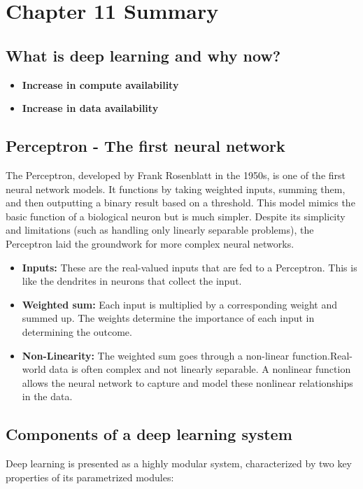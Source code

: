 \documentclass{article}
\begin{document}
\section{Chapter 11 Summary}

\subsection{What is deep learning and why now?}

\begin{itemize}
    \item \textbf{Increase in compute availability}
    \item \textbf{Increase in data availability}
\end{itemize}

\subsection{Perceptron - The first neural network}
The Perceptron, developed by Frank Rosenblatt in the 1950s, is one of the first neural network models. It functions by taking weighted inputs, summing them, and then outputting a binary result based on a threshold. This model mimics the basic function of a biological neuron but is much simpler. Despite its simplicity and limitations (such as handling only linearly separable problems), the Perceptron laid the groundwork for more complex neural networks.

\begin{itemize}
    \item \textbf{Inputs:} These are the real-valued inputs that are fed to a Perceptron. This is like the dendrites in neurons that collect the input.
    \item \textbf{Weighted sum:} Each input is multiplied by a corresponding weight and summed up. The weights determine the importance of each input in determining the outcome.
    \item \textbf{Non-Linearity:} The weighted sum goes through a non-linear function.Real-world data is often complex and not linearly separable. A nonlinear function allows the neural network to capture and model these nonlinear relationships in the data. 
\end{itemize}


\subsection{Components of a deep learning system}
Deep learning is presented as a highly modular system, characterized by two key properties of its parametrized modules:
\end{document}

